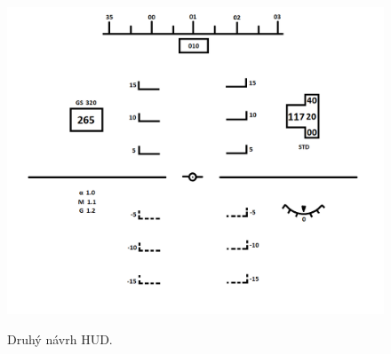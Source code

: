 \begin{figure}[ht]
\centering
\includegraphics[scale=0.35]{obrazky-figures/secondHUD.png}
\caption{Druhý návrh HUD.}{\label{secondHUD}}
\end{figure}
\newpage

